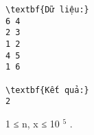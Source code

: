\begin{verbatim}
\textbf{Dữ liệu:}
6 4
2 3
1 2
4 5
1 6

\textbf{Kết quả:}
2
\end{verbatim}
1 ≤ n, x ≤ 10 $^ 5 $ .